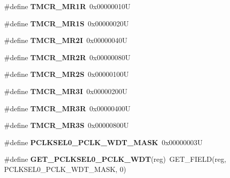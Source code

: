 \begin{DoxyCompactItemize}
\#define {\bfseries T\+M\+C\+R\+\_\+\+M\+R1R}~0x00000010U
\item 
\mbox{\label{group__lpc24xx__regs_ga20bc66503d01527fcf97698b02517000}} 
\#define {\bfseries T\+M\+C\+R\+\_\+\+M\+R1S}~0x00000020U
\item 
\mbox{\label{group__lpc24xx__regs_ga17f0e064307b3375d82c25907abbbe7f}} 
\#define {\bfseries T\+M\+C\+R\+\_\+\+M\+R2I}~0x00000040U
\item 
\mbox{\label{group__lpc24xx__regs_ga038a186a099a1e58797ed5561bcf9ac7}} 
\#define {\bfseries T\+M\+C\+R\+\_\+\+M\+R2R}~0x00000080U
\item 
\mbox{\label{group__lpc24xx__regs_ga3ab9b25a96001859f44f6ed9d59e1a31}} 
\#define {\bfseries T\+M\+C\+R\+\_\+\+M\+R2S}~0x00000100U
\item 
\mbox{\label{group__lpc24xx__regs_ga4d7853acb432b9cbf0fee65d239af6a4}} 
\#define {\bfseries T\+M\+C\+R\+\_\+\+M\+R3I}~0x00000200U
\item 
\mbox{\label{group__lpc24xx__regs_ga37a0b579661e9e710972a9289ad54af2}} 
\#define {\bfseries T\+M\+C\+R\+\_\+\+M\+R3R}~0x00000400U
\item 
\mbox{\label{group__lpc24xx__regs_ga9dfcf9fc302a57c0453042af8e50f57b}} 
\#define {\bfseries T\+M\+C\+R\+\_\+\+M\+R3S}~0x00000800U
\item 
\mbox{\label{group__lpc24xx__regs_ga7a61a1caae34ee2f5ca2bea6f03464cd}} 
\#define {\bfseries P\+C\+L\+K\+S\+E\+L0\+\_\+\+P\+C\+L\+K\+\_\+\+W\+D\+T\+\_\+\+M\+A\+SK}~0x00000003U
\item 
\mbox{\label{group__lpc24xx__regs_ga5cb2ee4ebeaca246fcd33a562c06a744}} 
\#define {\bfseries G\+E\+T\+\_\+\+P\+C\+L\+K\+S\+E\+L0\+\_\+\+P\+C\+L\+K\+\_\+\+W\+DT}(reg)~G\+E\+T\+\_\+\+F\+I\+E\+LD(reg, P\+C\+L\+K\+S\+E\+L0\+\_\+\+P\+C\+L\+K\+\_\+\+W\+D\+T\+\_\+\+M\+A\+SK, 0)
\item 
\mbox{\label{group__lpc24xx__regs_ga8c9563294e078f6c8e1a680b564c372b}} 

\end{DoxyCompactItemize}
